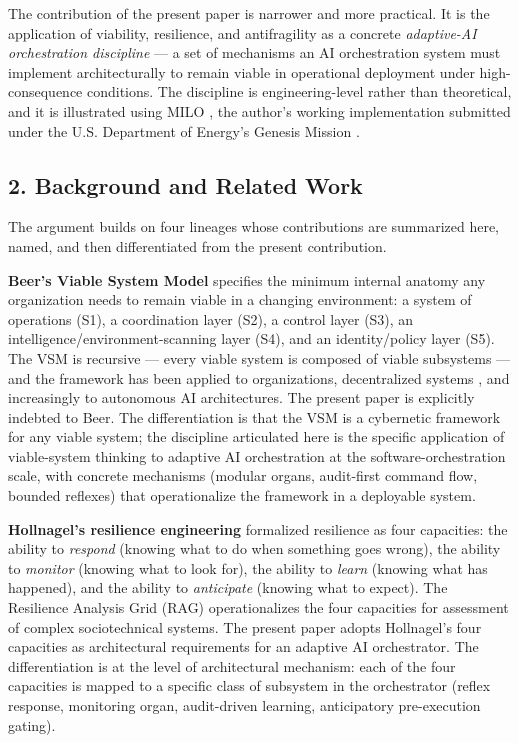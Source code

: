 The contribution of the present paper is narrower and more practical. It
is the application of viability, resilience, and antifragility as a
concrete \emph{adaptive-AI orchestration discipline} --- a set of
mechanisms an AI orchestration system must implement architecturally to
remain viable in operational deployment under high-consequence
conditions. The discipline is engineering-level rather than theoretical,
and it is illustrated using MILO \cite{ref4}, the author's working
implementation submitted under the U.S. Department of Energy's Genesis
Mission \cite{ref5}.

\subsection{2. Background and Related
Work}\label{background-and-related-work}

The argument builds on four lineages whose contributions are summarized
here, named, and then differentiated from the present contribution.

\textbf{Beer's Viable System Model} \cite{ref1} specifies the minimum
internal anatomy any organization needs to remain viable in a changing
environment: a system of operations (S1), a coordination layer (S2), a
control layer (S3), an intelligence/environment-scanning layer (S4), and
an identity/policy layer (S5). The VSM is recursive --- every viable
system is composed of viable subsystems --- and the framework has been
applied to organizations, decentralized systems \cite{ref8}, and
increasingly to autonomous AI architectures. The present paper is
explicitly indebted to Beer. The differentiation is that the VSM is a
cybernetic framework for any viable system; the discipline articulated
here is the specific application of viable-system thinking to adaptive
AI orchestration at the software-orchestration scale, with concrete
mechanisms (modular organs, audit-first command flow, bounded reflexes)
that operationalize the framework in a deployable system.

\textbf{Hollnagel's resilience engineering} \cite{ref2} formalized
resilience as four capacities: the ability to \emph{respond} (knowing
what to do when something goes wrong), the ability to \emph{monitor}
(knowing what to look for), the ability to \emph{learn} (knowing what
has happened), and the ability to \emph{anticipate} (knowing what to
expect). The Resilience Analysis Grid (RAG) operationalizes the four
capacities for assessment of complex sociotechnical systems. The present
paper adopts Hollnagel's four capacities as architectural requirements
for an adaptive AI orchestrator. The differentiation is at the level of
architectural mechanism: each of the four capacities is mapped to a
specific class of subsystem in the orchestrator (reflex response,
monitoring organ, audit-driven learning, anticipatory pre-execution
gating).

